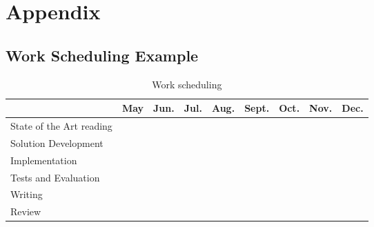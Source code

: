 \section{Appendix} %
\label{sec:attachments}
\subsection{Work Scheduling Example}
\begin{table}[H]
  \label{sub:work_scheduling}
  \label{tab:worktable}
  \begin{center}
    \begin{tabular}{|l||c|c|c|c|c|c|c|c|}
    \hline & \textbf{May} & \textbf{Jun.} & \textbf{Jul.} & \textbf{Aug.} & \textbf{Sept.} & \textbf{Oct.} & \textbf{Nov.} & \textbf{Dec.}\\
    \hline
    \hline
      State of the Art reading & \cellcolor{black!25} & \cellcolor{black!25} &   &   &  & &  &  \\
    \hline
      Solution Development & \cellcolor{black!25} & \cellcolor{black!25} &   &   &   & &  &  \\
    \hline
      Implementation &  & \cellcolor{black!25} & \cellcolor{black!25} & \cellcolor{black!25} & \cellcolor{black!25} &  &   &  \\
    \hline
      Tests and Evaluation &  &  &   &  & \cellcolor{black!25} & \cellcolor{black!25} &  &  \\
    \hline
      Writing &  & \cellcolor{black!25} & \cellcolor{black!25} & \cellcolor{black!25}  & \cellcolor{black!25} & \cellcolor{black!25} & \cellcolor{black!25} & \cellcolor{black!25} \\
    \hline
      Review &  &  &  &  &  & & \cellcolor{black!25} & \cellcolor{black!25} \\
    \hline
    \end{tabular}
    \caption{Work scheduling}
  \end{center}
\end{table}